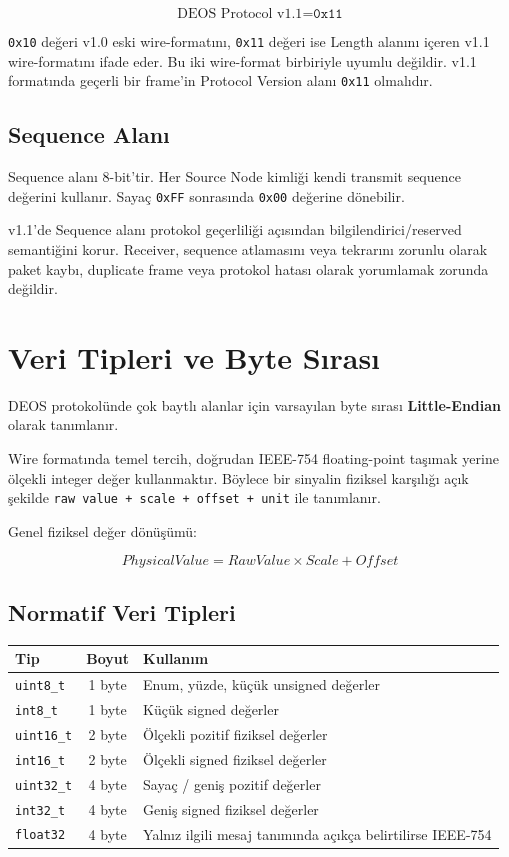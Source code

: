 \documentclass[a4paper,10pt]{article}
\newcommand{\hex}[1]{\texttt{0x#1}}
\newcommand{\code}[1]{\texttt{#1}}
\begin{document}
\[
\text{DEOS Protocol v1.1} = \hex{11}
\]

\hex{10} değeri v1.0 eski wire-formatını, \hex{11} değeri ise Length alanını içeren v1.1
wire-formatını ifade eder. Bu iki wire-format birbiriyle uyumlu değildir. v1.1 formatında
geçerli bir frame'in Protocol Version alanı \hex{11} olmalıdır.

\subsection{Sequence Alanı}

Sequence alanı 8-bit'tir. Her Source Node kimliği kendi transmit sequence değerini kullanır.
Sayaç \hex{FF} sonrasında \hex{00} değerine dönebilir.

v1.1'de Sequence alanı protokol geçerliliği açısından bilgilendirici/reserved semantiğini
korur. Receiver, sequence atlamasını veya tekrarını zorunlu olarak paket kaybı, duplicate
frame veya protokol hatası olarak yorumlamak zorunda değildir.

\section{Veri Tipleri ve Byte Sırası}

DEOS protokolünde çok baytlı alanlar için varsayılan byte sırası \textbf{Little-Endian}
olarak tanımlanır.

Wire formatında temel tercih, doğrudan IEEE-754 floating-point taşımak yerine ölçekli
integer değer kullanmaktır. Böylece bir sinyalin fiziksel karşılığı açık şekilde
\code{raw value + scale + offset + unit} ile tanımlanır.

Genel fiziksel değer dönüşümü:

\[
PhysicalValue = RawValue \times Scale + Offset
\]

\subsection{Normatif Veri Tipleri}

\begin{center}
\begin{tabularx}{\textwidth}{l c X}
\toprule
Tip & Boyut & Kullanım \\
\midrule
\code{uint8\_t}  & 1 byte & Enum, yüzde, küçük unsigned değerler \\
\code{int8\_t}   & 1 byte & Küçük signed değerler \\
\code{uint16\_t} & 2 byte & Ölçekli pozitif fiziksel değerler \\
\code{int16\_t}  & 2 byte & Ölçekli signed fiziksel değerler \\
\code{uint32\_t} & 4 byte & Sayaç / geniş pozitif değerler \\
\code{int32\_t}  & 4 byte & Geniş signed fiziksel değerler \\
\code{float32}   & 4 byte & Yalnız ilgili mesaj tanımında açıkça belirtilirse IEEE-754 \\
\bottomrule
\end{tabularx}
\end{center}
\end{document}

